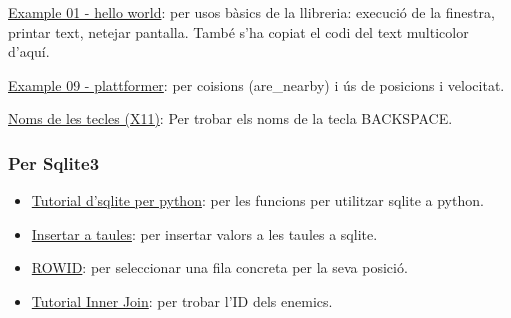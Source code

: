 \begin{itemize}
\begin{item}
\href{https://raw.githubusercontent.com/kitao/pyxel/main/python/pyxel/examples/01_hello_pyxel.py}
{Example 01 - hello world}:
per usos b\`asics de la llibreria:
execuci\'o de la finestra, printar text, netejar pantalla.
Tamb\'e s'ha copiat el codi del text multicolor d'aqu\'i.
\end{item}

\begin{item}
\href{https://raw.githubusercontent.com/kitao/pyxel/main/python/pyxel/examples/10_platformer.py}
{Example 09 - plattformer}:
per co\lgem isions (are\_nearby) i \'us de posicions i velocitat.
\end{item}

\begin{item}
\href{http://xahlee.info/linux/linux_show_keycode_keysym.html}
{Noms de les tecles (X11)}:
Per trobar els noms de la tecla BACKSPACE.
\end{item}
\end{itemize}



\subsubsection*{Per Sqlite3}
\begin{itemize}
\item{\href{https://pynative.com/python-sqlite/}
{Tutorial d'sqlite per python}}:
per les funcions per utilitzar sqlite a python.

\item{\href{https://www.sqlite.org/lang_insert.html}
{Insertar a taules}}:
per insertar valors a les taules a sqlite.

\item{\href{https://sqlite.org/rowidtable.html}
{ROWID}}:
per seleccionar una fila concreta per la seva posici\'o.

\item{\href{https://www.sqlitetutorial.net/sqlite-inner-join/}
{Tutorial Inner Join}}:
per trobar l'ID dels enemics.
\end{itemize}

